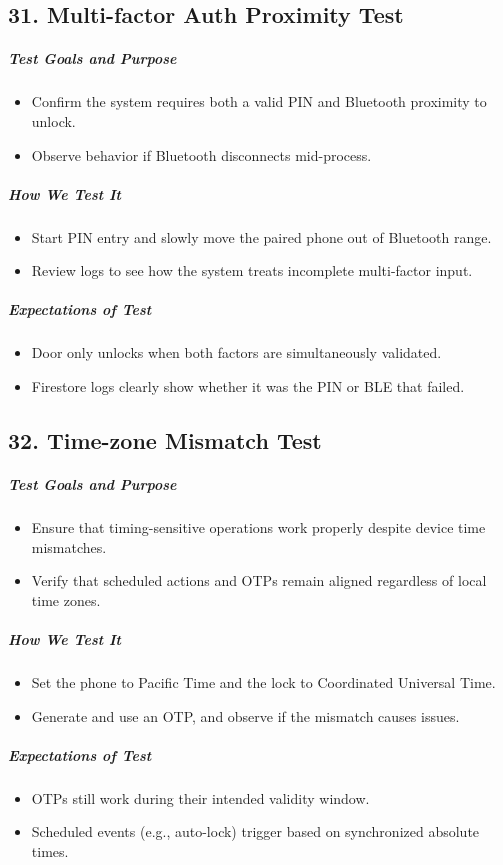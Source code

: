 \subsection*{31. Multi-factor Auth Proximity Test}
\subparagraph{Test Goals and Purpose}
\begin{itemize}
    \item Confirm the system requires both a valid PIN and Bluetooth proximity to unlock.
    \item Observe behavior if Bluetooth disconnects mid-process.
\end{itemize}
\subparagraph{How We Test It}
\begin{itemize}
    \item Start PIN entry and slowly move the paired phone out of Bluetooth range.
    \item Review logs to see how the system treats incomplete multi-factor input.
\end{itemize}
\subparagraph{Expectations of Test}
\begin{itemize}
    \item Door only unlocks when both factors are simultaneously validated.
    \item Firestore logs clearly show whether it was the PIN or BLE that failed.
\end{itemize}

\subsection*{32. Time-zone Mismatch Test}
\subparagraph{Test Goals and Purpose}
\begin{itemize}
    \item Ensure that timing-sensitive operations work properly despite device time mismatches.
    \item Verify that scheduled actions and OTPs remain aligned regardless of local time zones.
\end{itemize}
\subparagraph{How We Test It}
\begin{itemize}
    \item Set the phone to Pacific Time and the lock to Coordinated Universal Time.
    \item Generate and use an OTP, and observe if the mismatch causes issues.
\end{itemize}
\subparagraph{Expectations of Test}
\begin{itemize}
    \item OTPs still work during their intended validity window.
    \item Scheduled events (e.g., auto-lock) trigger based on synchronized absolute times.
\end{itemize}

